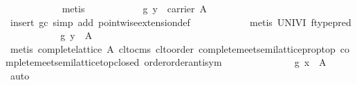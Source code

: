 \begin{isabellebody}
\ \ \ \ \ \ \ \ \ \ \isamarkupfalse%
\ metis\isanewline
\ \ \ \ \ \ \ \ \isamarkupfalse%
\ \isamarkupfalse%
\ {}g\ y\ {}\ carrier\ A{}\isanewline
\ \ \ \ \ \ \ \ \ \ \isamarkupfalse%
\ {}insert\ gc{}\ simp\ add{}\ pointwise{}extension{}def{}\isanewline
\ \ \ \ \ \ \ \ \ \ \isamarkupfalse%
\ {}metis\ UNIV{}I\ ftype{}pred{}\isanewline
\ \ \ \ \ \ \ \ \isamarkupfalse%
\ \isamarkupfalse%
\ {}g\ y\ {}\ {}\isactrlbsub A\isanewline
\ \ \ \ \ \ \ \ \ \ \isamarkupfalse%
\ {}metis\ {}complete{}lattice\ A{}\ cl{}to{}cms\ cl{}to{}order\ complete{}meet{}semilattice{}prop{}top\ complete{}meet{}semilattice{}top{}closed\ order{}order{}antisym{}\isanewline
\ \ \ \ \ \ \isamarkupfalse%
\isanewline
\ \ \ \ \ \ \isamarkupfalse%
\ {}g\ x\ {}\ {}\isactrlbsub A\ \isamarkupfalse%
\ auto\isanewline
\ \ \ \ \isamarkupfalse%
\isanewline
\ \ \isamarkupfalse%

\end{isabellebody}
